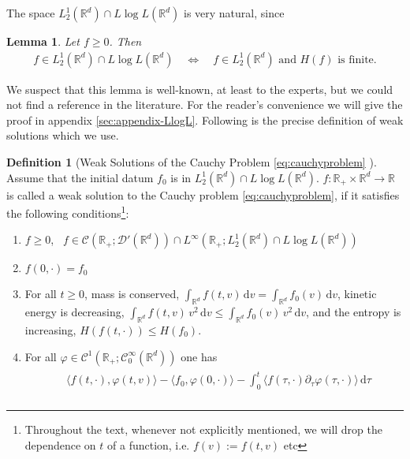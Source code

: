 \documentclass[11pt,a4paper,reqno]{amsart}
\theoremstyle{plain}
\newtheorem{lemma}[proposition]{Lemma}
\theoremstyle{definition}
\newtheorem{definition}[proposition]{Definition}
\begin{document}
The space $L^1_2({\mathbb{R}}^d)\cap L\log L({\mathbb{R}}^d)$ is very natural, since
\begin{lemma}\label{lem:entropy}
	Let $f\geq 0$. Then
	\begin{align*}
		f\in L^1_2({\mathbb{R}}^d)\cap L\log L({\mathbb{R}}^d) \quad  \Leftrightarrow  \quad f\in L^1_2({\mathbb{R}}^d) \text{ and } H(f) \text{ is finite}.
	\end{align*}
\end{lemma}
We suspect that this lemma is well-known, at least to the experts, but we could not find a reference in the literature. For the reader's convenience we will give the proof in appendix \ref{sec:appendix-LlogL}. Following is the precise definition of weak solutions which we use.

\begin{definition}[Weak Solutions of the Cauchy Problem \eqref{eq:cauchyproblem} \cite{Ark81,Vil98,Des95}]\label{def:weaksolution}
	Assume that the initial datum $f_0$ is in $L^1_2({\mathbb{R}}^d)\cap L\log L({\mathbb{R}}^d)$. $f: {\mathbb{R}}_+ \times {\mathbb{R}}^d \to {\mathbb{R}}$ is called a weak solution to the Cauchy problem \eqref{eq:cauchyproblem}, if it satisfies the following conditions\footnote{Throughout the text, whenever not explicitly mentioned, we will drop the dependence on $t$ of a function, i.e. $f(v):= f(t,v)$ etc}:
	\begin{enumerate}[label=(\roman*)]
		\item $f\geq 0$,\,\,\,  $f\in\mathcal{C}({\mathbb{R}}_+; \mathcal{D}'({\mathbb{R}}^d))\cap  L^{\infty}({\mathbb{R}}_+;L^1_2({\mathbb{R}}^d)\cap L \log L({\mathbb{R}}^d))$  
		\item $f(0,\cdot) = f_0$
		\item For all $t\geq 0$, mass is conserved, $\int_{{\mathbb{R}}^d} f(t,v) \, \mathrm{d} v = \int_{{\mathbb{R}}^d} f_0(v) \, \mathrm{d}v$, kinetic energy is decreasing, $\int_{{\mathbb{R}}^d} f(t,v)\, v^2 \, \mathrm{d} v \leq \int_{{\mathbb{R}}^d} f_0(v) \, v^2 \, \mathrm{d}v$, and the entropy is increasing, $H(f(t,\cdot))\leq H(f_0)$.
		\item For all $\varphi\in\mathcal{C}^1({\mathbb{R}}_+; \mathcal{C}_0^{\infty}({\mathbb{R}}^d))$ one has
		\begin{align}\label{eq:weakformulation}
		\begin{split}
			&\langle f(t,\cdot), \varphi(t,v) \rangle - \langle f_0 , \varphi(0,\cdot)\rangle - \int_0^t \langle f(\tau, \cdot) \partial_{\tau}\varphi(\tau,\cdot)\rangle \,  \mathrm{d}\tau \\

\end{split}
\end{align}
\end{enumerate}
\end{definition}
\end{document}
